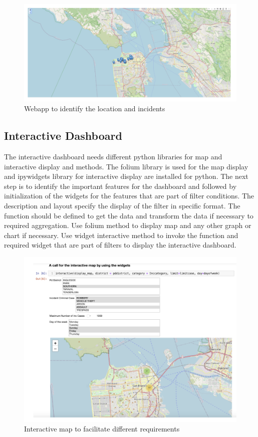 \documentclass[conference,final,]{IEEEtran}
\begin{document}
\begin{figure}

{\centering \includegraphics[width=0.5\linewidth]{img/fig14a} 

}

\caption{Webapp to identify the location and incidents}\label{fig:unnamed-chunk-13}
\end{figure}

\subsection{Interactive Dashboard}\label{interactive-dashboard}

The interactive dashboard needs different python libraries for map and
interactive display and methods. The folium library is used for the map display
and ipywidgets library for interactive display are installed for python.
The next step is to identify the important features for the dashboard
and followed by initialization of the widgets for the features that are
part of filter conditions. The description and layout specify the
display of the filter in specific format. The function should be defined
to get the data and transform the data if necessary to required
aggregation. Use folium method to display map and any other graph or
chart if necessary. Use widget interactive method to invoke the function
and required widget that are part of filters to display the interactive
dashboard.

\begin{figure}

{\centering \includegraphics[width=0.5\linewidth]{img/fig14b} 

}

\caption{Interactive map to facilitate different requirements}\label{fig:unnamed-chunk-14}
\end{figure}
\end{document}
